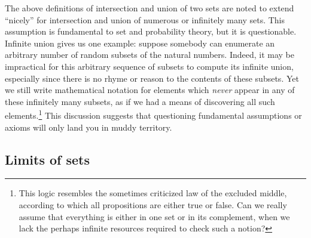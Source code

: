 \documentclass[12pt]{article}
\begin{document}
The above definitions of intersection and union of two sets are noted to extend ``nicely'' for intersection and union of numerous or infinitely many sets. This assumption is fundamental to set and probability theory, but it is questionable. Infinite union gives us one example: suppose somebody can enumerate an arbitrary number of random subsets of the natural numbers. Indeed, it may be impractical for this arbitrary sequence of subsets to compute its infinite union, especially since there is no rhyme or reason to the contents of these subsets. Yet we still write mathematical notation for elements which \emph{never} appear in any of these infinitely many subsets, as if we had a means of discovering all such elements.\footnote{This logic resembles the sometimes criticized law of the excluded middle, according to which all propositions are either true or false. Can we really assume that everything is either in one set or in its complement, when we lack the perhaps infinite resources required to check such a notion?} This discussion suggests that questioning fundamental assumptions or axioms will only land you in muddy territory. %

\subsection{Limits of sets}
\end{document}
